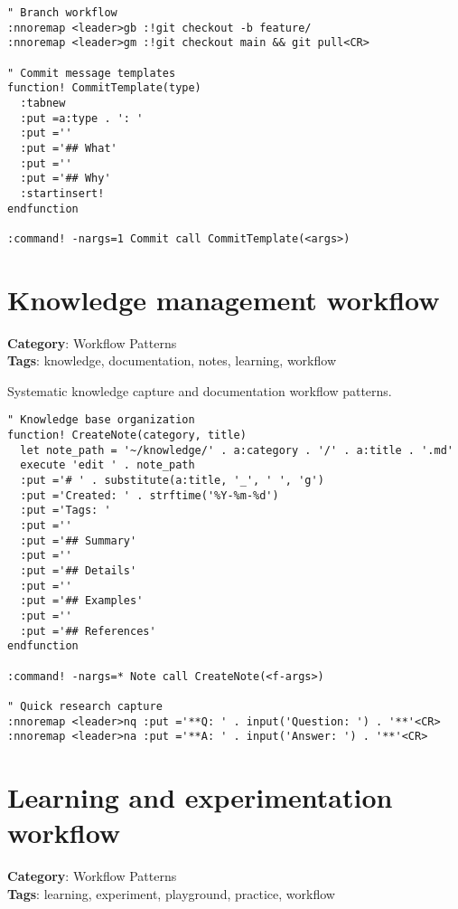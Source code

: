 {{{{{{{{{{{{{{{{{{{\begin{Exa*}{}
\begin{Verbatim}[fontsize=\footnotesize, breaklines, breakanywhere]
" Branch workflow
:nnoremap <leader>gb :!git checkout -b feature/
:nnoremap <leader>gm :!git checkout main && git pull<CR>

" Commit message templates
function! CommitTemplate(type)
  :tabnew
  :put =a:type . ': '
  :put =''
  :put ='## What'
  :put =''
  :put ='## Why'
  :startinsert!
endfunction

:command! -nargs=1 Commit call CommitTemplate(<args>)
\end{Verbatim}
\end{Exa*}

\section{Knowledge management workflow}

\textbf{Category}: Workflow Patterns\\ \textbf{Tags}: knowledge, documentation, notes, learning, workflow
\vspace{0.5cm}

Systematic knowledge capture and documentation workflow patterns.

\begin{Exa*}{}
\begin{Verbatim}[fontsize=\footnotesize, breaklines, breakanywhere]
" Knowledge base organization
function! CreateNote(category, title)
  let note_path = '~/knowledge/' . a:category . '/' . a:title . '.md'
  execute 'edit ' . note_path
  :put ='# ' . substitute(a:title, '_', ' ', 'g')
  :put ='Created: ' . strftime('%Y-%m-%d')
  :put ='Tags: '
  :put =''
  :put ='## Summary'
  :put =''
  :put ='## Details'
  :put =''
  :put ='## Examples'
  :put =''
  :put ='## References'
endfunction

:command! -nargs=* Note call CreateNote(<f-args>)

" Quick research capture
:nnoremap <leader>nq :put ='**Q: ' . input('Question: ') . '**'<CR>
:nnoremap <leader>na :put ='**A: ' . input('Answer: ') . '**'<CR>
\end{Verbatim}
\end{Exa*}

\section{Learning and experimentation workflow}

\textbf{Category}: Workflow Patterns\\ \textbf{Tags}: learning, experiment, playground, practice, workflow
\vspace{0.5cm}

}}}}}}}}}}}}}}}}}}}
